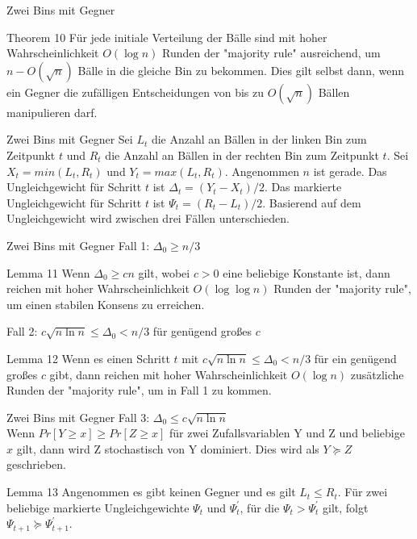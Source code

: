 \documentclass{beamer}
\begin{document}
    \begin{frame}{Zwei Bins mit Gegner}
        \begin{block}{Theorem 10}
            Für jede initiale Verteilung der Bälle sind mit hoher Wahrscheinlichkeit
            \(O(\log n)\) Runden der "majority rule" ausreichend, um
            \(n - O(\sqrt{n})\) Bälle in die gleiche Bin zu bekommen.
            Dies gilt selbst dann, wenn ein Gegner die zufälligen Entscheidungen
            von bis zu \(O(\sqrt{n})\) Bällen manipulieren darf.
        \end{block}
    \end{frame}
    \begin{frame}{Zwei Bins mit Gegner}
        Sei \(L_t\) die Anzahl an Bällen in der linken Bin zum Zeitpunkt \(t\)
        und \(R_t\) die Anzahl an Bällen in der rechten Bin zum Zeitpunkt \(t\).
        Sei \(X_t = min(L_t, R_t)\) und \(Y_t = max(L_t, R_t)\). Angenommen \(n\)
        ist gerade. Das Ungleichgewicht für Schritt \(t\) ist
        \(\Delta_t = (Y_t - X_t) /2\). Das markierte Ungleichgewicht für Schritt
        \(t\) ist \(\Psi_t = (R_t - L_t)/2\).
        Basierend auf dem Ungleichgewicht wird zwischen drei Fällen unterschieden.
    \end{frame}

    \begin{frame}{Zwei Bins mit Gegner}
        Fall 1: \(\Delta_0 \geq n/3\)

        \begin{block}{Lemma 11}
            Wenn \(\Delta_0 \geq cn\) gilt, wobei \(c > 0\) eine beliebige Konstante
            ist, dann reichen mit hoher Wahrscheinlichkeit \(O(\log \log n)\)
            Runden der "majority rule", um einen stabilen Konsens zu erreichen.
        \end{block}

        Fall 2: \(c \sqrt{n \ln n} \leq \Delta_0 < n/3\) für genügend großes \(c\)
        \begin{block}{Lemma 12}
            Wenn es einen Schritt \(t\) mit \(c\sqrt{n\ln n} \leq \Delta_0 < n/3\)
            für ein genügend großes \(c\) gibt, dann reichen mit hoher Wahrscheinlichkeit
            \(O(\log n)\) zusätzliche Runden der "majority rule", um in Fall 1
            zu kommen.
        \end{block}
    \end{frame}

    \begin{frame}{Zwei Bins mit Gegner}
        Fall 3: \(\Delta_0 \leq c\sqrt{n \ln n}\)\\
        Wenn \(Pr[Y \geq x] \geq Pr[Z \geq x]\) für zwei Zufallsvariablen Y und Z
        und beliebige \(x\) gilt, dann wird Z stochastisch von Y dominiert. Dies
        wird als \(Y \succeq Z\) geschrieben.
        \begin{block}{Lemma 13}
            Angenommen es gibt keinen Gegner und es gilt \(L_t \leq R_t \). Für
            zwei beliebige markierte Ungleichgewichte \(\Psi_t\) und \(\Psi_t^{'}\),
            für die \(\Psi_t > \Psi_t^{'}\) gilt, folgt
            \(\Psi_{t+1} \succeq \Psi_{t+1}^{'}\).
        \end{block}
    \end{frame}
\end{document}
